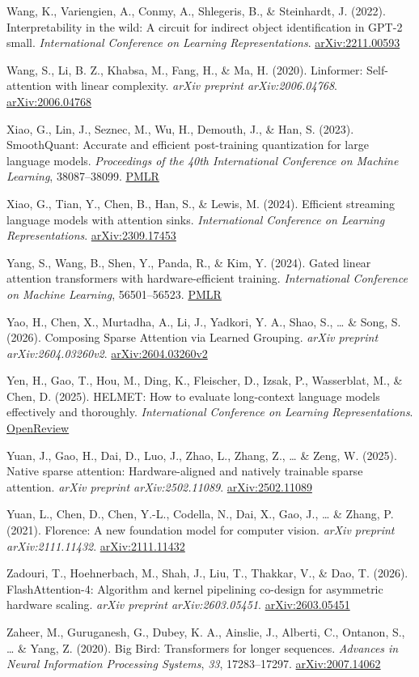 \documentclass[10pt,twocolumn]{article}
\begin{document}
Wang, K., Variengien, A., Conmy, A., Shlegeris, B., \& Steinhardt, J. (2022). Interpretability in the wild: A circuit for indirect object identification in GPT-2 small. \emph{International Conference on Learning Representations}. \href{https://arxiv.org/abs/2211.00593}{arXiv:2211.00593}

Wang, S., Li, B. Z., Khabsa, M., Fang, H., \& Ma, H. (2020). Linformer: Self-attention with linear complexity. \emph{arXiv preprint arXiv:2006.04768}. \href{https://arxiv.org/abs/2006.04768}{arXiv:2006.04768}

Xiao, G., Lin, J., Seznec, M., Wu, H., Demouth, J., \& Han, S. (2023). SmoothQuant: Accurate and efficient post-training quantization for large language models. \emph{Proceedings of the 40th International Conference on Machine Learning}, 38087--38099. \href{https://proceedings.mlr.press/v202/xiao23c.html}{PMLR}

Xiao, G., Tian, Y., Chen, B., Han, S., \& Lewis, M. (2024). Efficient streaming language models with attention sinks. \emph{International Conference on Learning Representations}. \href{https://arxiv.org/abs/2309.17453}{arXiv:2309.17453}

Yang, S., Wang, B., Shen, Y., Panda, R., \& Kim, Y. (2024). Gated linear attention transformers with hardware-efficient training. \emph{International Conference on Machine Learning}, 56501--56523. \href{https://proceedings.mlr.press/v235/yang24ab.html}{PMLR}

Yao, H., Chen, X., Murtadha, A., Li, J., Yadkori, Y. A., Shao, S., \ldots{} \& Song, S. (2026). Composing Sparse Attention via Learned Grouping. \emph{arXiv preprint arXiv:2604.03260v2}. \href{https://arxiv.org/abs/2604.03260}{arXiv:2604.03260v2}

Yen, H., Gao, T., Hou, M., Ding, K., Fleischer, D., Izsak, P., Wasserblat, M., \& Chen, D. (2025). HELMET: How to evaluate long-context language models effectively and thoroughly. \emph{International Conference on Learning Representations}. \href{https://openreview.net/forum?id=293V3bJbmE}{OpenReview}

Yuan, J., Gao, H., Dai, D., Luo, J., Zhao, L., Zhang, Z., \ldots{} \& Zeng, W. (2025). Native sparse attention: Hardware-aligned and natively trainable sparse attention. \emph{arXiv preprint arXiv:2502.11089}. \href{https://arxiv.org/abs/2502.11089}{arXiv:2502.11089}

Yuan, L., Chen, D., Chen, Y.-L., Codella, N., Dai, X., Gao, J., \ldots{} \& Zhang, P. (2021). Florence: A new foundation model for computer vision. \emph{arXiv preprint arXiv:2111.11432}. \href{https://arxiv.org/abs/2111.11432}{arXiv:2111.11432}

Zadouri, T., Hoehnerbach, M., Shah, J., Liu, T., Thakkar, V., \& Dao, T. (2026). FlashAttention-4: Algorithm and kernel pipelining co-design for asymmetric hardware scaling. \emph{arXiv preprint arXiv:2603.05451}. \href{https://arxiv.org/abs/2603.05451}{arXiv:2603.05451}

Zaheer, M., Guruganesh, G., Dubey, K. A., Ainslie, J., Alberti, C., Ontanon, S., \ldots{} \& Yang, Z. (2020). Big Bird: Transformers for longer sequences. \emph{Advances in Neural Information Processing Systems}, \emph{33}, 17283--17297. \href{https://arxiv.org/abs/2007.14062}{arXiv:2007.14062}
\end{document}
